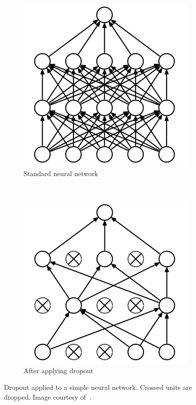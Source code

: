 \begin{figure}[h]
	\centering
	\begin{subfigure}{0.3\textwidth}
                \includegraphics[width=\textwidth]{plots/dropout1.png}
		\caption{Standard neural network}
        \end{subfigure}
	~
	\begin{subfigure}{0.3\textwidth}
                \includegraphics[width=\textwidth]{plots/dropout2.png}
		\caption{After applying dropout}
        \end{subfigure}
	\caption[Example of Dropout]{Dropout applied to a simple neural network. Crossed units are dropped. Image courtesy of~\cite{Srivastava2014}.}
	\label{fig:Dropout}
\end{figure}
